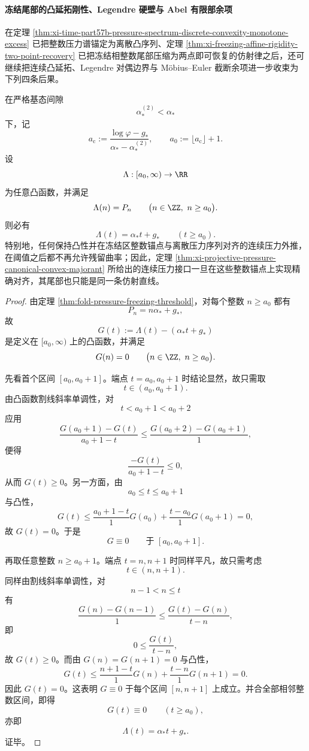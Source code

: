 \paragraph{冻结尾部的凸延拓刚性、Legendre 硬壁与 Abel 有限部余项}
在定理 \ref{thm:xi-time-part57b-pressure-spectrum-discrete-convexity-monotone-excess} 已把整数压力谱锚定为离散凸序列、定理 \ref{thm:xi-freezing-affine-rigidity-two-point-recovery} 已把冻结相整数尾部压缩为两点即可恢复的仿射律之后，还可继续把连续凸延拓、Legendre 对偶边界与 Möbius--Euler 截断余项进一步收束为下列四条后果。

\begin{theorem}[冻结阈值之后任意凸压力延拓的仿射刚性]\label{thm:xi-time-part57f-convex-extension-affine-tail}
在严格基态间隙
\[
\alpha_*^{(2)}<\alpha_*
\]
下，记
\[
a_{\mathrm c}:=\frac{\log\varphi-g_*}{\alpha_*-\alpha_*^{(2)}},
\qquad
a_0:=\lfloor a_{\mathrm c}\rfloor+1.
\]
设
\[
\Lambda:[a_0,\infty)\to\RR
\]
为任意凸函数，并满足
\[
\Lambda(n)=P_n
\qquad
\bigl(n\in\ZZ,\ n\ge a_0\bigr).
\]
则必有
\[
\boxed{\;
\Lambda(t)=\alpha_* t+g_*
\qquad
(t\ge a_0).\;}
\]
特别地，任何保持凸性并在冻结区整数锚点与离散压力序列对齐的连续压力外推，在阈值之后都不再允许残留曲率；因此，定理 \ref{thm:xi-projective-pressure-canonical-convex-majorant} 所给出的连续压力接口一旦在这些整数锚点上实现精确对齐，其尾部也只能是同一条仿射直线。
\end{theorem}
\begin{proof}
由定理 \ref{thm:fold-pressure-freezing-threshold}，对每个整数 \(n\ge a_0\) 都有
\[
P_n=n\alpha_*+g_*,
\]
故
\[
G(t):=\Lambda(t)-(\alpha_* t+g_*)
\]
是定义在 \([a_0,\infty)\) 上的凸函数，并满足
\[
G(n)=0
\qquad
\bigl(n\in\ZZ,\ n\ge a_0\bigr).
\]

先看首个区间 \([a_0,a_0+1]\)。端点 \(t=a_0,a_0+1\) 时结论显然，故只需取
\[
t\in(a_0,a_0+1).
\]
由凸函数割线斜率单调性，对
\[
t<a_0+1<a_0+2
\]
应用
\[
\frac{G(a_0+1)-G(t)}{a_0+1-t}
\le
\frac{G(a_0+2)-G(a_0+1)}{1},
\]
便得
\[
\frac{-G(t)}{a_0+1-t}\le 0,
\]
从而 \(G(t)\ge 0\)。另一方面，由
\[
a_0\le t\le a_0+1
\]
与凸性，
\[
G(t)\le
\frac{a_0+1-t}{1}G(a_0)+\frac{t-a_0}{1}G(a_0+1)=0,
\]
故 \(G(t)=0\)。于是
\[
G\equiv 0
\qquad\text{于 }[a_0,a_0+1].
\]

再取任意整数 \(n\ge a_0+1\)。端点 \(t=n,n+1\) 时同样平凡，故只需考虑
\[
t\in(n,n+1).
\]
同样由割线斜率单调性，对
\[
n-1<n\le t
\]
有
\[
\frac{G(n)-G(n-1)}{1}
\le
\frac{G(t)-G(n)}{t-n},
\]
即
\[
0\le \frac{G(t)}{t-n},
\]
故 \(G(t)\ge 0\)。而由 \(G(n)=G(n+1)=0\) 与凸性，
\[
G(t)\le
\frac{n+1-t}{1}G(n)+\frac{t-n}{1}G(n+1)=0.
\]
因此 \(G(t)=0\)。这表明 \(G\equiv 0\) 于每个区间 \([n,n+1]\) 上成立。并合全部相邻整数区间，即得
\[
G(t)\equiv 0
\qquad
(t\ge a_0),
\]
亦即
\[
\Lambda(t)=\alpha_* t+g_*.
\]
证毕。
\end{proof}

